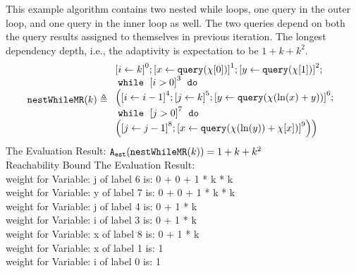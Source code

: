        \begin{example}
            \label{ex:nestedWhileMR}
            This example algorithm contains two nested while loops, one query in the outer loop, and one query in the inner loop as well.
            The two queries depend on both the query results assigned to themselves in previous iteration.
            The longest dependency depth, i.e., the adaptivity is expectation to be $1 + k + k^2 $.
            \[
            \kw{nestWhileMR}(k) \triangleq 
            \begin{array}{l}
                \clabel{\assign{i}{k} }^{0} ; 
                \clabel{ \assign{x}{\query(\chi[0])}}^{1} ; 
                \clabel{ \assign{y}{\query(\chi[1])}}^{2} ; \\
                \ewhile ~ \clabel{i > 0}^{3} ~ \edo ~ \\
                \Big(
                \clabel{\assign{i}{i-1}}^{4} ;
                \clabel{\assign{j}{k}}^{5} ;
                \clabel{\assign{y}{\query(\chi(\ln(x) + y))} }^{6}  ; \\
                \ewhile ~ \clabel{j > 0}^{7} ~ \edo ~ \\
                \Big(
                \clabel{\assign{j}{j-1}}^{8};
                \clabel{\assign{x}{\query(\chi(\ln(y))+\chi[x])} }^{9}
                \Big) \Big)
            \end{array}
            \]
            The Evaluation Result: 
            $ {\mathtt{A_{est}}}(\mathtt{nestWhileMR}(k)) = 1 + k + k^2$
            \\
            Reachability Bound The Evaluation Result: \\
            weight for Variable: j of label 6 is: 0 + 0 + 1 * k * k\\
            weight for Variable: y of label 7 is: 0 + 0 + 1 * k * k\\
            weight for Variable: j of label 4 is: 0 + 1 * k\\
            weight for Variable: i of label 3 is: 0 + 1 * k\\
            weight for Variable: x of label 8 is: 0 + 1 * k\\
            weight for Variable: x of label 1 is: 1\\
            weight for Variable: i of label 0 is: 1\\
            \end{example}
